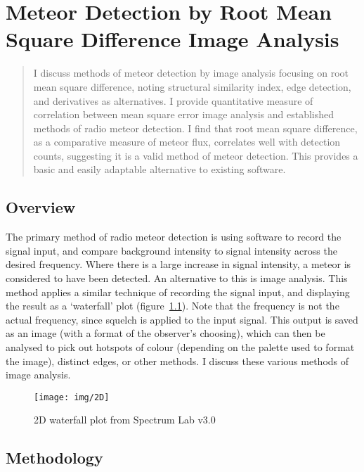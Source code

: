 \chapter{Meteor Detection by Root Mean Square Difference Image Analysis}
\label{chap:image}
\begin{strip}
	\begin{minipage}{\textwidth}
		\begin{abstract}
			I discuss methods of meteor detection by image analysis focusing on root mean square difference, noting structural similarity index, edge detection, and derivatives as alternatives. I provide quantitative measure of correlation between mean square error image analysis and established methods of radio meteor detection. I find that root mean square difference, as a comparative measure of meteor flux, correlates well with detection counts, suggesting it is a valid method of meteor detection. This provides a basic and easily adaptable alternative to existing software.
		\end{abstract}
	\end{minipage}
\end{strip}
\section{Overview}
The primary method of radio meteor detection is using software to record the signal input, and compare background intensity to signal intensity across the desired frequency. Where there is a large increase in signal intensity, a meteor is considered to have been detected. An alternative to this is image analysis. This method applies a similar technique of recording the signal input, and displaying the result as a `waterfall' plot (figure~\ref{fig:img:waterfall}). Note that the frequency is not the actual frequency, since squelch is applied to the input signal. This output is saved as an image (with a format of the observer's choosing), which can then be analysed to pick out hotspots of colour (depending on the palette used to format the image), distinct edges, or other methods. I discuss these various methods of image analysis.
\begin{figure}
	\centering
	\texttt{[image: img/2D]}
	\caption{2D waterfall plot from Spectrum Lab v3.0 \cite{speclab}
		\label{fig:img:waterfall}}
\end{figure}
\section{Methodology}

